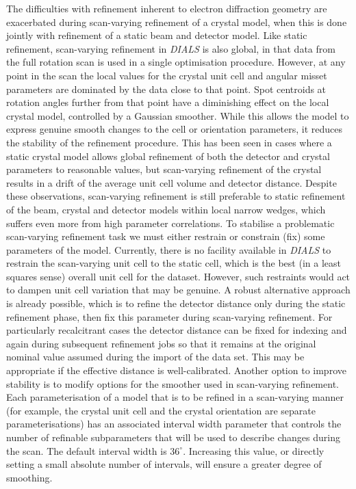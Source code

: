 \documentclass[preprint]{iucr}
\newcommand{\dials}{\emph{DIALS}\xspace}
\begin{document}
The difficulties with refinement inherent to electron diffraction geometry are
exacerbated during scan-varying refinement of a crystal model, when this is
done jointly with refinement of a static beam and detector model. Like static
refinement, scan-varying refinement in \dials is also global, in that data from
the full rotation scan is used in a single optimisation procedure. However, at
any point in the scan the local values for the crystal unit cell and angular
misset parameters are dominated by the data close to that point. Spot centroids
at rotation angles further from that point have a diminishing effect on the
local crystal model, controlled by a Gaussian smoother. While this allows the
model to express genuine smooth changes to the cell or orientation parameters,
it reduces the stability of the refinement procedure. This has been seen in
cases where a static crystal model allows global refinement of both the
detector and crystal parameters to reasonable values, but scan-varying
refinement of the crystal results in a drift of the average unit cell volume
and detector distance. Despite these observations, scan-varying refinement is
still preferable to static refinement of the beam, crystal and detector models
within local narrow wedges, which suffers even more from high parameter
correlations. To stabilise a problematic scan-varying refinement task we must
either restrain or constrain (fix) some parameters of the model. Currently,
there is no facility available in \dials to restrain the scan-varying unit cell
to the static cell, which is the best (in a least squares sense) overall unit
cell for the dataset. However, such restraints would act to dampen unit cell
variation that may be genuine. A robust alternative approach is already
possible, which is to refine the detector distance only during the static
refinement phase, then fix this parameter during scan-varying refinement. For
particularly recalcitrant cases the detector distance can be fixed for indexing
and again during subsequent refinement jobs so that it remains at the original
nominal value assumed during the import of the data set. This may be
appropriate if the effective distance is well-calibrated. Another option to
improve stability is to modify options for the smoother used in scan-varying
refinement. Each parameterisation of a model that is to be refined in a
scan-varying manner (for example, the crystal unit cell and the crystal
orientation are separate parameterisations) has an associated interval width
parameter that controls the number of refinable subparameters that will be used
to describe changes during the scan. The default interval width is $36^\circ$.
Increasing this value, or directly setting a small absolute number of
intervals, will ensure a greater degree of smoothing.
\end{document}

